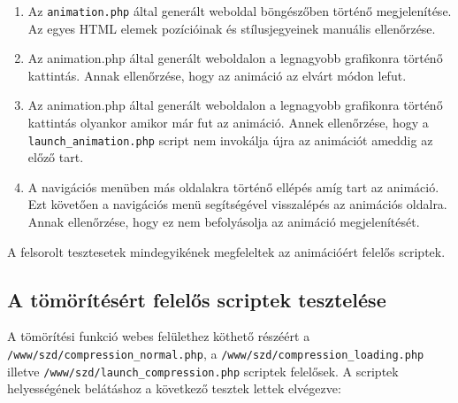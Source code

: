 \documentclass[oneside,titlepage,12pt,a4paper]{report}
\begin{document}
\begin{enumerate}
\item Az \texttt{animation.php} által generált weboldal böngészőben történő megjelenítése. Az egyes HTML elemek pozícióinak és stílusjegyeinek manuális ellenőrzése.
\item Az animation.php által generált weboldalon a legnagyobb grafikonra történő kattintás. Annak ellenőrzése, hogy az animáció az elvárt módon lefut.
\item Az animation.php által generált weboldalon a legnagyobb grafikonra történő kattintás olyankor amikor már fut az animáció. Annek ellenőrzése, hogy a \texttt{launch\_animation.php} script nem invokálja újra az animációt ameddig az előző tart.
\item A navigációs menüben más oldalakra történő ellépés amíg tart az animáció. Ezt követően a navigációs menü segítségével visszalépés az animációs oldalra. Annak ellenőrzése, hogy ez nem befolyásolja az animáció megjelenítését.
\end{enumerate}

A felsorolt tesztesetek mindegyikének megfeleltek az animációért felelős scriptek.

\subsection{A tömörítésért felelős scriptek tesztelése}

A tömörítési funkció webes felülethez köthető részéért a \texttt{/www/szd/compression\_normal.php}, a \texttt{/www/szd/compression\_loading.php} illetve \texttt{/www/szd/launch\_compression.php} scriptek felelősek. A scriptek helyességének belátáshoz a következő tesztek lettek elvégezve:
\end{document}
